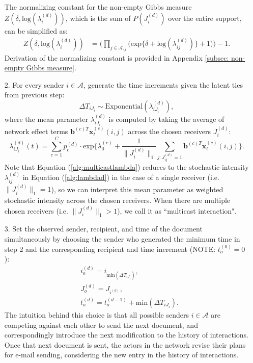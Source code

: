 \documentclass[a4paper]{article}
\begin{document}
\begin{itemize}
	The normalizing constant for the non-empty Gibbs measure $Z(\delta,\mbox{log}(\lambda_i^{(d)}))$, which is the sum of $P(J_i^{(d)})$ over the entire support, can be simplified as: 
	\begin{equation}
	\begin{aligned}
	Z(\delta,\mbox{log}(\lambda_i^{(d)})) &=\Big(\prod_{j \in \mathcal{A}_{\backslash i}} \Big(\mbox{exp}\{\delta+\mbox{log}(\lambda_{ij}^{(d)})\} + 1\Big)\Big)-1.
		\end{aligned}
				\label{alg:normalizingconstant}
	\end{equation}
	Derivation of the normalizing constant is provided in Appendix \ref{subsec: non-empty Gibbs measure}.
	\item[2.] For every sender $i \in \mathcal{A}$, generate the time increments given the latent ties from previous step: \begin{equation}
\Delta T_{i{J_i}} \sim \mbox{Exponential}(\lambda_{i{J_i}}^{(d)}),
		\label{alg:timeincrement}
	\end{equation}
	where the mean parameter $\lambda_{i{J_i}}^{(d)}$ is computed by taking the average of network effect terms $\boldsymbol{b}^{(c)T}\boldsymbol{x}^{(c)}_t(i, j)$ across the chosen receivers $J_i^{(d)}$:
	\begin{equation}
	\lambda^{(d)}_{iJ_i}(t)= \sum\limits_{c=1}^{C} p^{(d)}_c\cdot\mbox{exp}\Big\{\lambda^{(c)}_0+\frac{1}{\lVert J_i^{(d)} \rVert_1}\sum\limits_{j: J^{(d)}_{ij}=1} \boldsymbol{b}^{(c)T}\boldsymbol{x}^{(c)}_t(i, j)\Big\}.
			\label{alg:multicastlambda}
	\end{equation}
	Note that Equation (\ref{alg:multicastlambda}) reduces to the stochastic intensity $\lambda_{ij}^{(d)}$ in Equation (\ref{alg:lambdad}) in the case of a single receiver (i.e. $\lVert J_i^{(d)}\rVert_1 = 1$), so we can interpret this mean parameter as weighted stochastic intensity across the chosen receivers. When there are multiple chosen receivers (i.e. $\lVert J_i^{(d)}\rVert_1 > 1$), we call it as ``multicast interaction".
	 	 \item[3.] Set the observed sender, recipient, and time of the document simultaneously by choosing the sender who generated the minimum time in step 2 and the corresponding recipient and time increment (NOTE: $t_o^{(0)}=0$):
	 	 \begin{equation}
	 	 \begin{aligned}
	 	  &i_o^{(d)} = i_{\mbox{min}(\Delta T_{i{J_i}})}, \\
	 	  &J_o^{(d)} = J_{i^{(d)}},\\
	 	  	 &t_o^{(d)} = t_o^{(d-1)}+\mbox{min}(\Delta T_{i{J_i}}).
	 	  \end{aligned}
	 	 \end{equation}
	 	 The intuition behind this choice is that all possible senders $i \in \mathcal{A}$ are competing against each other to send the next document, and correspondingly introduce the next modification to the history of interactions. Once that next document is sent, the actors in the network revise their plans for e-mail sending, considering the new entry in the history of interactions.
\end{itemize}
\end{document}
